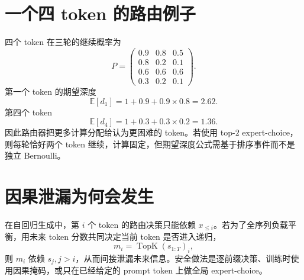 \documentclass[UTF8,12pt,a4paper,fontset=none]{ctexart}
\numberwithin{equation}{section}
\newcommand{\E}{\mathbb{E}}
\begin{document}
\section{一个四 token 的路由例子}
四个 token 在三轮的继续概率为
\begin{equation}
 P=\begin{pmatrix}
 0.9&0.8&0.5\\
 0.8&0.2&0.1\\
 0.6&0.6&0.6\\
 0.3&0.2&0.1
 \end{pmatrix}.
\end{equation}
第一个 token 的期望深度
\begin{equation}
 \E[d_1]=1+0.9+0.9\times0.8=2.62.
\end{equation}
第四个 token
\begin{equation}
 \E[d_4]=1+0.3+0.3\times0.2=1.36.
\end{equation}
因此路由器把更多计算分配给认为更困难的 token。若使用 top-$2$ expert-choice，则每轮恰好两个 token 继续，计算固定，但期望深度公式需基于排序事件而不是独立 Bernoulli。

\section{因果泄漏为何会发生}
在自回归生成中，第 $i$ 个 token 的路由决策只能依赖 $x_{\le i}$。若为了全序列负载平衡，用未来 token 分数共同决定当前 token 是否进入递归，
\begin{equation}
 m_i=\operatorname{TopK}(s_{1:T})_i,
\end{equation}
则 $m_i$ 依赖 $s_{j},j>i$，从而间接泄漏未来信息。安全做法是逐前缀决策、训练时使用因果掩码，或只在已经给定的 prompt token 上做全局 expert-choice。
\end{document}
